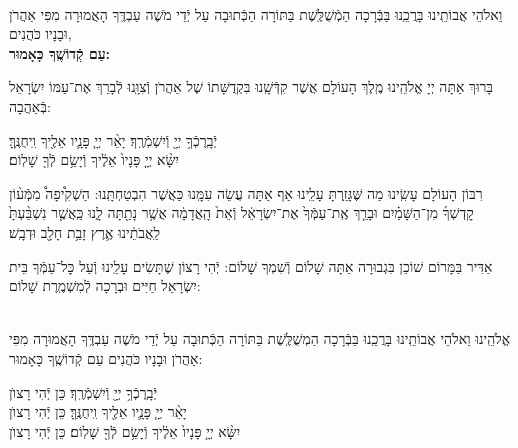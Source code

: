 \documentclass[twoside, openany, parskip=half, 11pt]{book}
\begin{document}
\begin{sometimes}


\\
\shatz {}
וֵאלֹהֵי אֲבוֹתֵֽינוּ בָּרֲכֵֽנוּ בַּבְּֿרָכָה הַמְֿשֻׁלֶּֽשֶׁת בַּתּוֹרָה הַכְּֿתוּבָה עַל יְֿדֵי מֹשֶׁה עַבְדֶּֽךָ הָאֲמוּרָה מִפִּי אַהֲרֹן וּבָנָיו כֹּהֲנִים,\\
\textbf{עַם קְֿדוֹשֶֽׁךָ כָּאָמוּר:}

בָּרוּךְ אַתָּה יְיָ אֱלֹהֵֽינוּ מֶֽלֶךְ הָעוֹלָם אֲשֶׁר קִדְּֿשָֽׁנוּ בִּקְדֻשָּׁתוֹ שֶׁל אַהֲרֹן וְֿצִוָּֽנוּ לְֿבָרֵךְ אֶת־עַמּוֹ יִשְׂרָאֵל בְּֿאַהֲבָה:

יְֿבָֽרֶכְֿךָ֥ יְיָ֖ וְֿיִשְׁמְֿרֶֽךָ׃ \quad יָאֵ֨ר יְיָ֧ פָּנָ֛יו אֵלֶ֖יךָ וִֽיחֻנֶּֽךָּ׃\\ יִשָּׂ֨א יְיָ֤ פָּנָיו֙ אֵלֶ֔יךָ וְֿיָשֵׂ֥ם לְֿךָ֖ שָׁלֽוֹם׃

\nextpage

\begin{paracol}{2}
רִבּוֹן הָעוֹלָם עָשִֽׂינוּ מַה שֶּׁגָּזַֽרְתָּ עָלֵֽינוּ אַף אַתָּה עֲשֵׂה עִמָּֽנוּ כַּאֲשֶׁר הִבְטַחְתָּֽנוּ: הַשְׁקִ֩יפָה֩ מִמְּֿע֨וֹן קׇדְשְׁךָ֜ מִן־הַשָּׁמַ֗יִם וּבָרֵ֤ךְ אֶֽת־עַמְּֿךָ֙ אֶת־יִשְׂרָאֵ֔ל וְֿאֵת֙ הָֽאֲדָמָ֔ה אֲשֶׁ֥ר נָתַ֖תָּה לָ֑נוּ כַּֽאֲשֶׁ֤ר נִשְׁבַּ֨עְתָּ֙ לַֽאֲבֹתֵ֔ינוּ אֶ֛רֶץ זָבַ֥ת חָלָ֖ב וּדְבָֽשׁ׃

\switchcolumn

\kahal
אַדִּיר בַּמָּרוֹם שׁוֹכֵן בִּגְבוּרָה אַתָּה שָׁלוֹם וְֿשִׁמְךָ שָׁלוֹם: יְֿהִי רָצוֹן שֶׁתָּשִׂים עָלֵֽינוּ וְֿעַל כׇּל־עַמְּֿךָ בֵּית יִשְׂרָאֵל חַיִּים וּבְרָכָה לְֿמִשְׁמֶֽרֶת שָׁלוֹם:
\end{paracol}

\sepline

\\
אֱלֹהֵֽינוּ וֵאלֹהֵי אֲבוֹתֵֽינוּ בָּרֲכֵֽנוּ בַּבְּֿרָכָה הַמְשֻׁלֶּֽשֶׁת בַּתּוֹרָה
הַכְּֿתוּבָה עַל יְֿדֵי מֹשֶׁה עַבְדֶּֽךָ הָאֲמוּרָה מִפִּי אַהֲרֹן וּבָנָיו כֹּהֲנִים עַם קְֿדוֹשֶֽׁךָ כָּאָמוּר:

יְֿבָֽרֶכְֿךָ֥ יְיָ֖ וְֿיִשְׁמְֿרֶֽךָ׃ \hfill \kahal כֵּן יְֿהִי רָצוׂן \\
יָאֵ֨ר יְיָ֧ פָּנָ֛יו אֵלֶ֖יךָ וִֽיחֻנֶּֽךָּ׃ \hfill \kahal כֵּן יְֿהִי רָצוׂן \\
יִשָּׂ֨א יְיָ֤ פָּנָיו֙ אֵלֶ֔יךָ וְֿיָשֵׂ֥ם לְֿךָ֖ שָׁלֽוֹם׃ \hfill \kahal כֵּן יְֿהִי רָצוׂן

\end{sometimes}
\end{document}
